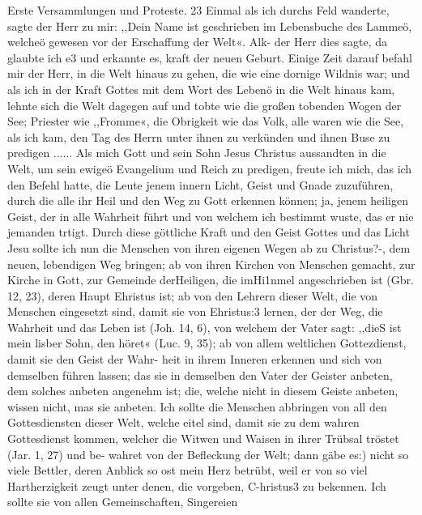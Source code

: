 Erste Versammlungen und Proteste. 23
Einmal als ich durchs Feld wanderte, sagte der Herr zu mir:
,,Dein Name ist geschrieben im Lebensbuche des Lammeö, welcheö
gewesen vor der Erschaffung der Welt«. Alk- der Herr dies sagte,
da glaubte ich e3 und erkannte es, kraft der neuen Geburt. Einige
Zeit darauf befahl mir der Herr, in die Welt hinaus zu gehen,
die wie eine dornige Wildnis war; und als ich in der Kraft
Gottes mit dem Wort des Lebenö in die Welt hinaus kam, lehnte
sich die Welt dagegen auf und tobte wie die großen tobenden
Wogen der See; Priester wie ,,Fromme«, die Obrigkeit wie das
Volk, alle waren wie die See, als ich kam, den Tag des Herrn
unter ihnen zu verkünden und ihnen Buse zu predigen ......
Als mich Gott und sein Sohn Jesus Christus aussandten
in die Welt, um sein ewigeö Evangelium und Reich zu predigen,
freute ich mich, das ich den Befehl hatte, die Leute jenem innern
Licht, Geist und Gnade zuzuführen, durch die alle ihr Heil und
den Weg zu Gott erkennen können; ja, jenem heiligen Geist,
der in alle Wahrheit führt und von welchem ich bestimmt wuste,
das er nie jemanden trtigt.
Durch diese göttliche Kraft und den Geist Gottes und das
Licht Jesu sollte ich nun die Menschen von ihren eigenen Wegen
ab zu Christus?-, dem neuen, lebendigen Weg bringen; ab von
ihren Kirchen von Menschen gemacht, zur Kirche in Gott, zur
Gemeinde derHeiligen, die imHi1nmel angeschrieben ist (Gbr. 12, 23),
deren Haupt Ehristus ist; ab von den Lehrern dieser Welt, die
von Menschen eingesetzt sind, damit sie von Ehristus:3 lernen, der
der Weg, die Wahrheit und das Leben ist (Joh. 14, 6), von welchem
der Vater sagt: ,,dieS ist mein lisber Sohn, den höret« (Luc. 9, 35);
ab von allem weltlichen Gottezdienst, damit sie den Geist der Wahr-
heit in ihrem Inneren erkennen und sich von demselben führen
lassen; das sie in demselben den Vater der Geister anbeten, dem
solches anbeten angenehm ist; die, welche nicht in diesem Geiste
anbeten, wissen nicht, mas sie anbeten. Ich sollte die Menschen
abbringen von all den Gottesdiensten dieser Welt, welche eitel
sind, damit sie zu dem wahren Gottesdienst kommen, welcher die
Witwen und Waisen in ihrer Trübsal tröstet (Jar. 1, 27) und be-
wahret von der Befleckung der Welt; dann gäbe es:) nicht so viele
Bettler, deren Anblick so ost mein Herz betrübt, weil er von so
viel Hartherzigkeit zeugt unter denen, die vorgeben, C-hristus3 zu
bekennen. Ich sollte sie von allen Gemeinschaften, Singereien


